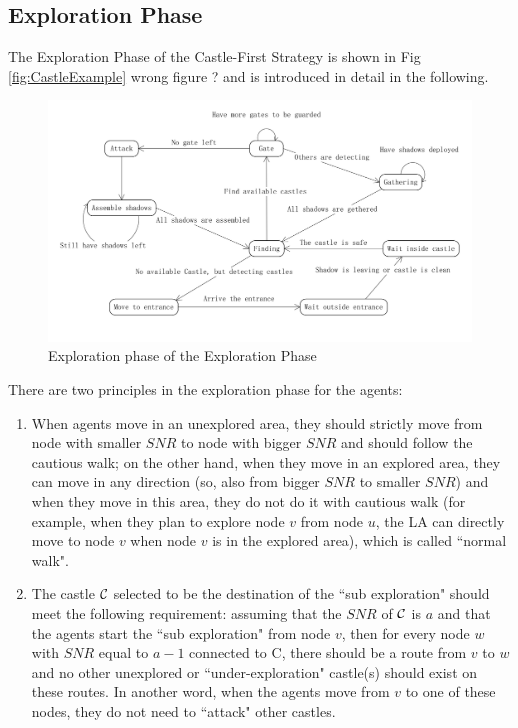 \subsection{ Exploration Phase}
The Exploration Phase of the Castle-First Strategy is shown in Fig \ref{fig:CastleExample} \color{blue} wrong figure ? \color{black} and is introduced in detail in the following.
\begin{figure}[H]
  \centering  
  \includegraphics[width=6.0in]{figures/castlestates.png}
  \caption{Exploration phase of the Exploration Phase}\label{fig:castlestates}
\end{figure} 
 
There are two principles in the exploration phase for the agents:
\begin{enumerate}
\item When agents move in an unexplored area, they should strictly move from node with smaller $SNR$ to node with bigger $SNR$ and should follow the cautious walk; on the other hand,  when they move in an explored area, they can move in  any direction   (so, also from bigger $SNR$ to smaller $SNR$) and when they  move in this area, they  do not do it with cautious walk  (for example, when they plan to explore node $v$ from node $u$, the LA can directly move to node $v$ when node $v$ is in the explored area), which is called ``normal walk".
\item The castle ${\cal C}$ selected to be the destination of the ``sub exploration" should meet  the following requirement: assuming that the $SNR$ of ${\cal C}$ is $a$ and 
that the agents start the  ``sub exploration" from node  $v$, 
 then for every node $w$ with $SNR$ equal to $a-1$ connected to {\cal C}, there should be a route from   $v$ to $w$    and no other unexplored or ``under-exploration" castle(s)  should exist on these routes. In another word, when the agents move from $v$ to one of these nodes,   they do not  need to ``attack" other castles. 
\end{enumerate}  

